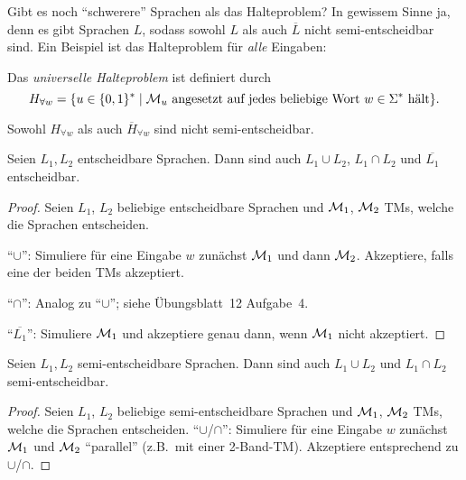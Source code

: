 \begin{Bemerkung}
	Gibt es noch "`schwerere"' Sprachen als das Halteproblem?
	In gewissem Sinne ja, denn es gibt Sprachen $L$, sodass sowohl $L$ als auch $\overline{L}$ nicht semi-entscheidbar sind.
	Ein Beispiel ist das Halteproblem für \emph{alle} Eingaben:
\end{Bemerkung}


\begin{Def}[name={[Universelles Halteproblem $H_{\forall w}$]}]
	Das \emph{universelle Halteproblem} ist definiert durch
	$$
	H_{\forall w} = \{u\in\{0,1\}^* \mid \text{$\mathcal{M}_u$ angesetzt auf jedes beliebige Wort $w \in \Sigma^*$ hält}\}. \qedhere
	$$
\end{Def}

\begin{Satz}[name={[Universelles Halteproblem $H_{\forall w}$]}]
	Sowohl $H_{\forall w}$ als auch $\overline{H}_{\forall w}$ sind nicht semi-entscheidbar.
\end{Satz}

\begin{Satz}
	Seien $L_1, L_2$ entscheidbare Sprachen.
	Dann sind auch $L_1 \cup L_2$, $L_1 \cap L_2$ und $\overline{L_1}$ entscheidbar.
\end{Satz}


\begin{proof}
	Seien $L_1$, $L_2$ beliebige entscheidbare Sprachen und $\mathcal{M}_1$, $\mathcal{M}_2$ \ac{TM}s, welche die Sprachen entscheiden.

	"`$\cup$"': Simuliere für eine Eingabe $w$ zunächst $\mathcal{M}_1$ und dann $\mathcal{M}_2$.
	Akzeptiere, falls eine der beiden \ac{TM}s akzeptiert.

	"`$\cap$"': Analog zu "`$\cup$"'; siehe Übungsblatt~12 Aufgabe~4.

	"`$\overline{L_1}$"': Simuliere $\mathcal{M}_1$ und akzeptiere genau dann, wenn $\mathcal{M}_1$ nicht akzeptiert.
\end{proof}

\begin{Satz}\label{satz:SemidetCupCap}
	Seien $L_1, L_2$ semi-entscheidbare Sprachen.
	Dann sind auch $L_1 \cup L_2$ und $L_1 \cap L_2$ semi-entscheidbar.
\end{Satz}


\begin{proof}
	Seien $L_1$, $L_2$ beliebige semi-entscheidbare Sprachen und $\mathcal{M}_1$, $\mathcal{M}_2$ \ac{TM}s, welche die Sprachen entscheiden.
	"`$\cup$/$\cap$"': Simuliere für eine Eingabe $w$ zunächst $\mathcal{M}_1$ und $\mathcal{M}_2$ "`parallel"' (z.B.\ mit einer 2-Band-\ac{TM}).
	Akzeptiere entsprechend zu $\cup$/$\cap$.
\end{proof}


